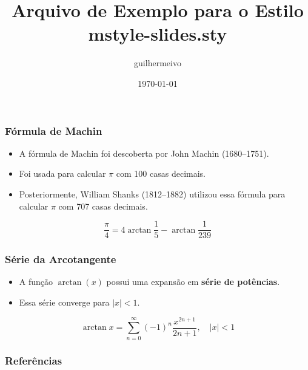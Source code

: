 \documentclass{beamer}
\title{Arquivo de Exemplo para o Estilo mstyle-slides.sty}
\author{guilhermeivo}
\date{\today}
\begin{document}
\frame[plain]{\titlepage}

\begin{frame}
\frametitle{Fórmula de Machin}

\begin{itemize}
\item A fórmula de Machin foi descoberta por John Machin (1680--1751).
\item Foi usada para calcular $\pi$ com 100 casas decimais.
\item Posteriormente, William Shanks (1812--1882) utilizou essa fórmula para calcular $\pi$ com 707 casas decimais.
\end{itemize}

\medskip

\begin{equation}
\frac{\pi}{4}=4\arctan\frac{1}{5}-\arctan\frac{1}{239}
\end{equation}

\end{frame}

\begin{frame}
\frametitle{Série da Arcotangente}

\begin{itemize}
\item A função $\arctan(x)$ possui uma expansão em \textbf{série de potências}.
\item Essa série converge para $|x| < 1$.
\end{itemize}

\begin{equation}
\arctan x=\sum\limits_{n=0}^{\infty}(-1)^{n}\frac{x^{2n+1}}{2n+1},\quad\lvert x\rvert<1
\end{equation}

\end{frame}

\begin{frame}
\frametitle{Referências}

\nocite{pi-source-book}
\nocite{special-issue}
\nocite{aocc-user-guide}
\nocite{ieee}




\end{frame}
\end{document}

